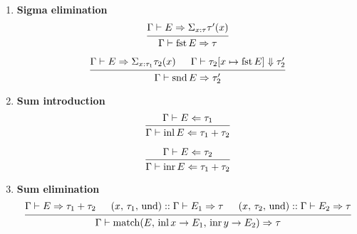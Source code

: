 \documentclass{article}
\begin{document}
\begin{definition} 
\begin{enumerate}
  \item \textbf{Sigma elimination} \\
    \[
      \begin{prooftree}
        \hypo{\Gamma \vdash E \Rightarrow \Sigma_{x : \tau}\tau'(x)}
        \infer1{\Gamma \vdash \fst E \Rightarrow \tau}
      \end{prooftree}
    \]

    \[
      \begin{prooftree}
        \hypo{\Gamma \vdash E \Rightarrow \Sigma_{x : \tau_1}\tau_2(x)}
        \hypo{\Gamma \vdash \tau_2[x \mapsto \fst E] \Downarrow \tau_2'}
        \infer2{\Gamma \vdash \snd E \Rightarrow \tau_2'}
      \end{prooftree}
    \]


    \item \textbf{Sum introduction} \\
    \[
      \begin{prooftree}
       \hypo{\Gamma \vdash E \Leftarrow \tau_1} 
       \infer1{\Gamma \vdash \inl E \Leftarrow \tau_1 + \tau_2} 
      \end{prooftree}
    \]

    \[
     \begin{prooftree}
      \hypo{\Gamma \vdash E \Leftarrow \tau_2} 
      \infer1{\Gamma \vdash \inr E \Leftarrow \tau_1 + \tau_2} 
     \end{prooftree}
   \]

   \item \textbf{Sum elimination} \\
    \[
    \begin{prooftree}
      \hypo{\Gamma \vdash E \Rightarrow \tau_1 + \tau_2}
      \hypo{(x, \, \tau_1, \, \text{und}) :: \Gamma \vdash E_1 \Rightarrow \tau}
      \hypo{(x, \, \tau_2, \, \text{und}) :: \Gamma \vdash E_2 \Rightarrow \tau}
      \infer3{\Gamma \vdash \match(E, \, \inl x \rightarrow E_1, \, \inr y \rightarrow E_2)
               \Rightarrow \tau}
    \end{prooftree}  
  \]


\end{enumerate}
\end{definition}
\end{document}
